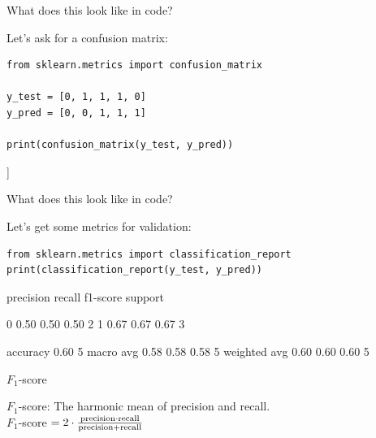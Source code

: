 \documentclass[handout]{beamer}
\begin{document}
\begin{frame}[fragile]{What does this look like in code?}
	
Let's ask for a confusion matrix: 

\begin{lstlisting}
from sklearn.metrics import confusion_matrix

y_test = [0, 1, 1, 1, 0]
y_pred = [0, 0, 1, 1, 1]

print(confusion_matrix(y_test, y_pred))
\end{lstlisting}

\begin{lstlistingoutput}
[[1  1 ]
[ 1  2]]
\end{lstlistingoutput}
	
\end{frame}


\begin{frame}[fragile]{What does this look like in code?}
	
Let's get some metrics for validation: 
	
\begin{lstlisting}
from sklearn.metrics import classification_report
print(classification_report(y_test, y_pred))
\end{lstlisting}
	
\begin{lstlistingoutput}
              precision    recall  f1-score   support

0       0.50      0.50      0.50         2
1       0.67      0.67      0.67         3

accuracy                           0.60         5
macro avg       0.58      0.58      0.58         5
weighted avg       0.60      0.60      0.60         5
\end{lstlistingoutput}
	
\end{frame}


\begin{frame}{\(F_1\)-score}
	
	\(F_1\)-score: The harmonic mean of precision and recall. \\
	
	\(F_1\)-score \(= 2 \cdot \frac{\rm precision \cdot recall}{\rm precision + recall}\)
	
	
	
\end{frame}
\end{document}
